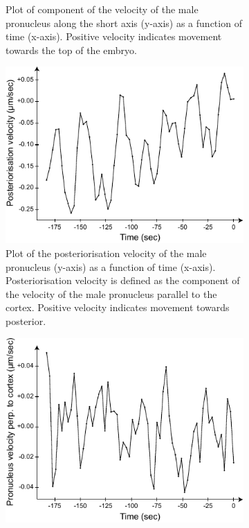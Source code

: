 \begin{figure}[p]
\begin{subfigure}[t]{0.45\textwidth}
    \caption{Plot of component of the velocity of the male pronucleus along the short axis (y-axis) as a function of time (x-axis). Positive velocity indicates movement towards the top of the embryo.} 
    \label{subfig:malePronucleusTrackingVelocities-vyVsTime}
\end{subfigure}

\begin{subfigure}[t]{0.45\textwidth}
    \centering
    \includegraphics[width=\textwidth]{ExpMethods/FigTrackNucleus/postVelVsTime.pdf}
    \caption{Plot of the posteriorisation velocity of the male pronucleus (y-axis) as a function of time (x-axis). Posteriorisation velocity is defined as the component of the velocity of the male pronucleus parallel to the cortex. Positive velocity indicates movement towards posterior.} 
    \label{subfig:malePronucleusTrackingVelocities-postVelVsTime}
\end{subfigure}
\hfill
\begin{subfigure}[t]{0.45\textwidth}
    \centering
    \includegraphics[width=\textwidth]{ExpMethods/FigTrackNucleus/perpVelVsTime.pdf}

\end{subfigure}
\end{figure}
